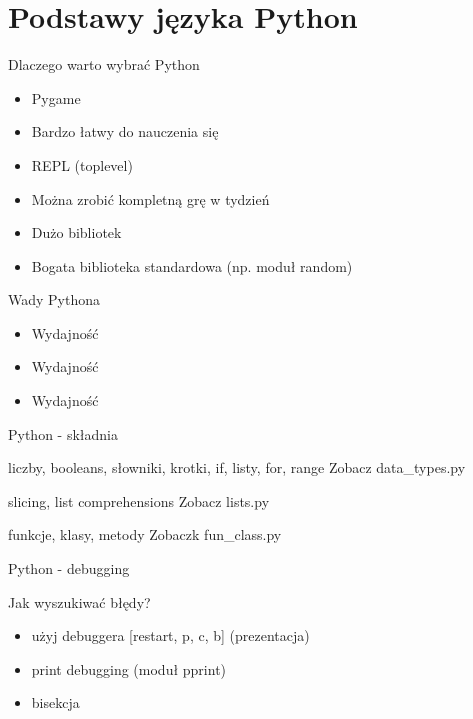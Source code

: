 \documentclass{beamer}
\begin{document}
\section{Podstawy języka Python}
\begin{frame}{Dlaczego warto wybrać Python}
  \begin{block}
    \begin{itemize}
    \item Pygame
    \item Bardzo łatwy do nauczenia się
    \item REPL (toplevel)
    \item Można zrobić kompletną grę w tydzień
    \item Dużo bibliotek
    \item Bogata biblioteka standardowa (np. moduł random)
    \end{itemize}
  \end{block}
\end{frame}

\begin{frame}{Wady Pythona}
  \begin{block}
    \begin{itemize}
    \item Wydajność
    \item Wydajność
    \item Wydajność
    \end{itemize}
  \end{block}
\end{frame}

\begin{frame}{Python - składnia}
  \begin{block}{liczby, booleans, słowniki, krotki, if, listy, for, range}
    Zobacz data\_types.py
  \end{block}

  \begin{block}{slicing, list comprehensions}
    Zobacz lists.py
  \end{block}

  \begin{block}{funkcje, klasy, metody}
    Zobaczk fun\_class.py
  \end{block}
\end{frame}

\begin{frame}{Python - debugging}
  \begin{block}{Jak wyszukiwać błędy?}
    \begin{itemize}
    \item użyj debuggera [restart, p, c, b] (prezentacja)
    \item print debugging (moduł pprint)
    \item bisekcja
    \end{itemize}
  \end{block}
\end{frame}
\end{document}

